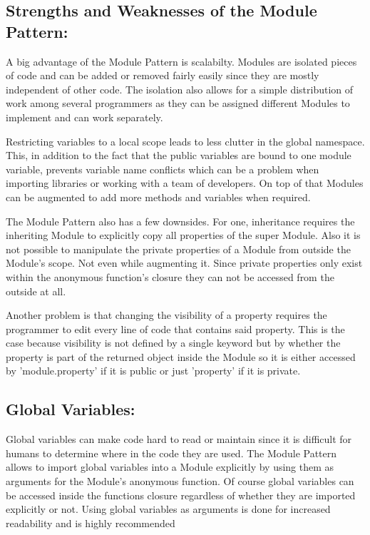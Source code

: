 \documentclass{bioinfo}
\begin{document}
\subsection{Strengths and Weaknesses of the Module Pattern:}
A big advantage of the Module Pattern is scalabilty. Modules are isolated pieces of code and can be added or removed fairly easily since they are mostly independent of other code. The isolation also allows for a simple distribution of work among several programmers as they can be assigned different Modules to implement and can work separately.\\

\begin{flushleft}
Restricting variables to a local scope leads to less clutter in the global namespace. This, in addition to the fact that the public variables are bound to one module variable, prevents variable name conflicts which can be a problem when importing libraries or working with a team of developers. On top of that Modules can be augmented to add more methods and variables when required.
\end{flushleft}

The Module Pattern also has a few downsides. For one, inheritance requires the inheriting Module to explicitly copy all properties of the super Module. Also it is not possible to manipulate the private properties of a Module from outside the Module's scope. Not even while augmenting it. Since private properties only exist within the anonymous function's closure they can not be accessed from the outside at all. \vspace{\baselineskip}

Another problem is that changing the visibility of a property requires the programmer to edit every line of code that contains said property. This is the case because visibility is not defined by a single keyword but by whether the property is part of the returned object inside the Module so it is either accessed by 'module.property' if it is public or just 'property' if it is private.


\subsection{Global Variables:}
Global variables can make code hard to read or maintain since it is difficult for humans to determine where in the code they are used. The Module Pattern allows to import global variables into a Module explicitly by using them as arguments for the Module's anonymous function. Of course global variables can be accessed inside the functions closure regardless of whether they are imported explicitly or not. Using global variables as arguments is done for increased readability and is highly recommended\cite{adequatelygood}\\
\end{document}
